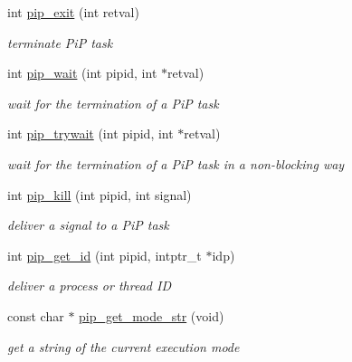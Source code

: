 \begin{DoxyCompactItemize}
\item 
int \hyperlink{group__libpip_gaf9be37d927121b9327b5fca2417ccec2}{pip\-\_\-exit} (int retval)
\begin{DoxyCompactList}\small\item\em terminate Pi\-P task \end{DoxyCompactList}\end{DoxyCompactItemize}
\begin{DoxyCompactItemize}
\item 
int \hyperlink{group__libpip_ga3adad6a3e2311a46b2bfdd9d9062811b}{pip\-\_\-wait} (int pipid, int $\ast$retval)
\begin{DoxyCompactList}\small\item\em wait for the termination of a Pi\-P task \end{DoxyCompactList}\end{DoxyCompactItemize}
\begin{DoxyCompactItemize}
\item 
int \hyperlink{group__libpip_ga02cab8b77b62ffcd98bd1bbb1e32b7e7}{pip\-\_\-trywait} (int pipid, int $\ast$retval)
\begin{DoxyCompactList}\small\item\em wait for the termination of a Pi\-P task in a non-\/blocking way \end{DoxyCompactList}\end{DoxyCompactItemize}
\begin{DoxyCompactItemize}
\item 
int \hyperlink{group__libpip_ga4a396f38920d94b71dcfd3c898fbb82b}{pip\-\_\-kill} (int pipid, int signal)
\begin{DoxyCompactList}\small\item\em deliver a signal to a Pi\-P task \end{DoxyCompactList}\end{DoxyCompactItemize}
\begin{DoxyCompactItemize}
\item 
int \hyperlink{group__libpip_ga8ed1ba448edbc0f2e0af78abdcc62b7c}{pip\-\_\-get\-\_\-id} (int pipid, intptr\-\_\-t $\ast$idp)
\begin{DoxyCompactList}\small\item\em deliver a process or thread I\-D \end{DoxyCompactList}\end{DoxyCompactItemize}
\begin{DoxyCompactItemize}
\item 
const char $\ast$ \hyperlink{group__libpip_ga0e12c95fe7abc5c356acfd45a89ad5d8}{pip\-\_\-get\-\_\-mode\-\_\-str} (void)
\begin{DoxyCompactList}\small\item\em get a string of the current execution mode \end{DoxyCompactList}\end{DoxyCompactItemize}
